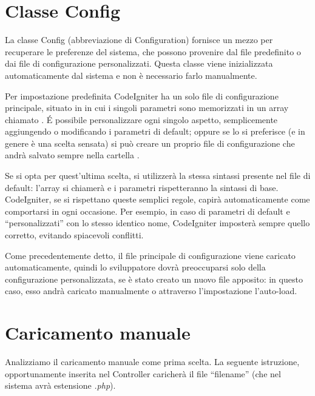 \section{Classe Config}
\label{class:config}

La classe Config (abbreviazione di Configuration) fornisce un mezzo per recuperare le preferenze del sistema, che possono provenire dal file predefinito  o dai file di configurazione personalizzati. Questa classe viene inizializzata automaticamente dal sistema e non è necessario farlo manualmente.

Per impostazione predefinita CodeIgniter ha un solo file di configurazione principale, situato in  in cui i singoli parametri sono memorizzati in un array chiamato . \'E possibile personalizzare ogni singolo aspetto, semplicemente aggiungendo o modificando i parametri di default; oppure se lo si preferisce (e in genere è una scelta sensata) si può creare un proprio file di configurazione che andrà salvato sempre nella cartella .

Se si opta per quest'ultima scelta, si utilizzerà la stessa sintassi presente nel file di default: l'array si chiamerà  e i parametri rispetteranno la sintassi di base. CodeIgniter, se si rispettano queste semplici regole, capirà automaticamente come comportarsi in ogni occasione. Per esempio, in caso di parametri di default e ``personalizzati'' con lo stesso identico nome, CodeIgniter imposterà sempre quello corretto, evitando spiacevoli conflitti.

Come precedentemente detto, il file principale di configurazione viene caricato automaticamente, quindi lo sviluppatore dovrà preoccuparsi solo della configurazione personalizzata, se è stato creato un nuovo file apposito: in questo caso, esso andrà caricato manualmente o attraverso l'impostazione l'auto-load.

\section*{Caricamento manuale}
Analizziamo il caricamento manuale come prima scelta. La seguente istruzione, opportunamente inserita nel Controller caricherà il file ``filename'' (che nel sistema avrà estensione \emph{.php}).


